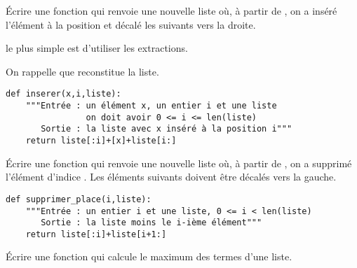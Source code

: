 \begin{Exercise}[title= Insertion dans une liste]
Écrire une fonction  qui renvoie une nouvelle liste où, à partir de , on a inséré l'élément  à la position  et décalé les suivants vers la droite.
\end{Exercise}
\begin{Answer}
le plus simple est d'utiliser les extractions.

On rappelle que  reconstitue la liste.
\begin{lstlisting}
def inserer(x,i,liste):
    """Entrée : un élément x, un entier i et une liste
                on doit avoir 0 <= i <= len(liste)
       Sortie : la liste avec x inséré à la position i"""
    return liste[:i]+[x]+liste[i:]
\end{lstlisting}
\end{Answer}
\begin{Exercise}[title= Suppression d'une position]
 Écrire une fonction  qui renvoie une nouvelle liste où, à partir de , on a supprimé l'élément d'indice . Les éléments suivants doivent être décalés vers la gauche.
\end{Exercise}
\begin{Answer}
\begin{lstlisting}
def supprimer_place(i,liste):
    """Entrée : un entier i et une liste, 0 <= i < len(liste)
       Sortie : la liste moins le i-ième élément"""
    return liste[:i]+liste[i+1:]
\end{lstlisting}
\end{Answer}
\begin{Exercise}[title=Maximum]
Écrire une fonction qui calcule le maximum des termes d'une liste.
\end{Exercise}
